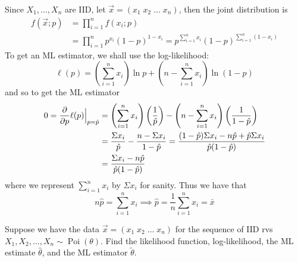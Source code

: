 \documentclass[notoc,notitlepage]{tufte-book}
\DeclareMathOperator{\Poi}{Poi }
\begin{document}
\begin{solution}
  Since $X_1, ..., X_n$ are IID, let $\vec{x} = ( x_1 \; x_2 \; \hdots \; x_n )$, then the joint distribution is
  \begin{align*}
    f(\vec{x}; p) &= \prod_{i=1}^{n} f(x_i; p) \\
                  &= \prod_{i=1}^{n} p^{x_i} ( 1 - p )^{1 - x_i} = p^{ \sum\limits_{i=1}^{n} x_i }(1 - p)^{\sum\limits_{i=1}^{n} (1 - x_i)}
  \end{align*}
  To get an ML estimator, we shall use the log-likelihood:
  \begin{equation*}
    \ell(p) = \left( \sum_{i=1}^{n} x_i \right) \ln p + \left( n - \sum_{i=1}^{n} x_i \right) \ln (1 - p)
  \end{equation*}
  and so to get the ML estimator
  \begin{align*}
    0 = \frac{\partial}{\partial p} \ell(p) \Big|_{p = \hat{p}}^{} &= \left( \sum_{i=1}^{n} x_i \right) \left( \frac{1}{\hat{ p }} \right) - \left( n - \sum_{i=1}^{n} x_i \right) \left( \frac{1}{1 - \hat{ p }} \right) \\
                                                               &= \frac{\Sigma x_i}{\hat{p}} - \frac{n - \Sigma x_i}{1 - \hat{p}} = \frac{(1 - \hat{p}) \Sigma x_i - n\hat{p} + \hat{p} \Sigma x_i}{\hat{p} (1 - \hat{p})} \\
                                                               &= \frac{\Sigma x_i - n\hat{p}}{\hat{p}(1 - \hat{p})}
  \end{align*}
  where we represent $\sum_{i=1}^{n} x_i$ by $\Sigma x_i$ for sanity. Thus we have that
  \begin{equation*}
    n \hat{p} = \sum_{i=1}^{n} x_i \implies \hat{p} = \frac{1}{n} \sum_{i=1}^{n} x_i = \bar{x}
  \end{equation*}
\end{solution}

\begin{eg}\label{eg:6_3}
  Suppose we have the data $\vec{x} = ( x_1 \; x_2 \; \hdots \; x_n )$ for the sequence of IID rvs $X_1, X_2, ..., X_n \sim \Poi(\theta)$. Find the likelihood function, log-likelihood, the ML estimate $\hat{\theta}$, and the ML estimator $\tilde{\theta}$.
\end{eg}
\end{document}

